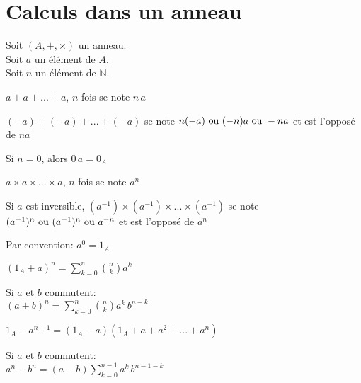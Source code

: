 \documentclass[12pt,twoside,a4paper]{article}
\begin{document}
	\section{Calculs dans un anneau}
		\begin{flushleft}
			Soit $(A,+,\times)$ un anneau.\\
			Soit $a$ un élément de $A$.\\
			Soit $n$ un élément de $\mathbb{N}$.
			\begin{liste}
				\item $a+a+...+a$, $n$ fois se note $n\,a$
				\item $(-a)+(-a)+...+(-a)$ se note $n(-a)\text{ ou }(-n)a\text{ ou } -na$ et est l'opposé de $na$
				\item Si $n=0$, alors $0\,a=0_A$
				\item $a\times a\times...\times a$, $n$ fois se note $a^{n}$
				\item Si $a$ est inversible, $(a^{-1})\times(a^{-1})\times...\times(a^{-1})$ se note $(a^{-1})^n\text{ ou }(a^{-1})^n\text{ ou } a^{-n}$ et est l'opposé de $a^n$
				\item Par convention: $a^0=1_A$
			\end{liste}
		\end{flushleft}
		\begin{prop}
			\begin{liste}
				\item $\left( 1_A+a\right) ^n=\sum\limits_{k=0}^n\binom{n}{k}a^k$
				\item \underline{Si $a$ et $b$ commutent:}\\
					$\left(a+b\right) ^n=\sum\limits_{k=0}^n\binom{n}{k}a^k\,b^{n-k}$\\
					
				\item $1_A-a^{n+1}=(1_A-a)(1_A+a+a^{2}+...+a^{n})$
				\item \underline{Si $a$ et $b$ commutent:}\\
					$a^n-b^n=(a-b)\sum\limits_{k=0}^{n-1}a^k\,b^{n-1-k}$
			\end{liste}
		\end{prop}
\end{document}
